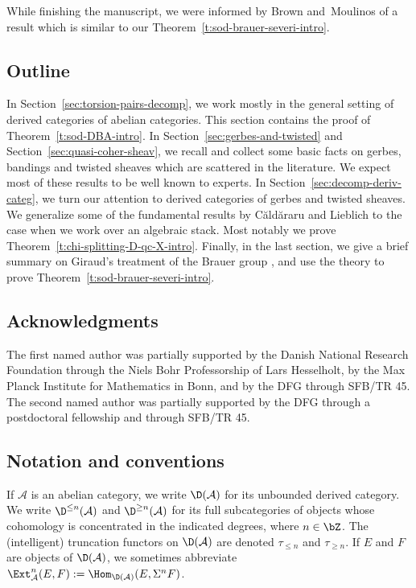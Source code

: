 While finishing the manuscript, we were informed by Brown and~Moulinos of a result \cite[Theorem 3.1]{bm2019}
which is similar to our Theorem~\ref{t:sod-brauer-severi-intro}.

\subsection*{Outline}
In Section~\ref{sec:torsion-pairs-decomp},
we work mostly in the general setting of derived categories of abelian categories.
This section contains the proof of Theorem~\ref{t:sod-DBA-intro}.
In Section~\ref{sec:gerbes-and-twisted} and Section~\ref{sec:quasi-coher-sheav},
we recall and collect some basic facts on gerbes,
bandings and twisted sheaves which are scattered in the literature.
We expect most of these results to be well known to experts.
In Section~\ref{sec:decomp-deriv-categ}, we turn our attention to derived categories of gerbes and twisted sheaves.
We generalize some of the fundamental results by C{\u{a}}ld{\u{a}}raru and Lieblich \cite{caldararu2000, lieblich2004}
to the case when we work over an algebraic stack.
Most notably we prove Theorem~\ref{t:chi-splitting-D-qc-X-intro}.
Finally, in the last section,
we give a brief summary on Giraud's treatment of the Brauer group \cite[Section~V.4]{giraud1971},
and use the theory to prove Theorem~\ref{t:sod-brauer-severi-intro}.

\subsection*{Acknowledgments}
The first named author was partially supported by the Danish National
Research Foundation through the Niels Bohr Professorship of Lars Hesselholt,
by the Max Planck Institute for Mathematics in Bonn,
and by the DFG through SFB/TR 45.
The second named author was partially supported by the DFG through a postdoctoral fellowship and through SFB/TR 45.

\subsection*{Notation and conventions}
\label{sec:conventions}

If $\mathcal{A}$ is an abelian category, we write
$\D(\mathcal{A})$ for its unbounded derived category. 
We write $\D^{\leq n}(\mathcal{A})$ and 
$\D^{\geq n}(\mathcal{A})$ for its full subcategories of objects
whose cohomology is concentrated in the indicated degrees, where
$n \in \bZ$.
The (intelligent) truncation functors on $\D(\mathcal{A})$ are
denoted $\tau_{\leq n}$ and $\tau_{\geq n}$. 
If $E$ and $F$ are objects of $\D(\mathcal{A})$, we 
sometimes abbreviate
$\Ext^n_\mathcal{A}(E,F):=\Hom_{\D(\mathcal{A})}(E, \Sigma^nF)$.

